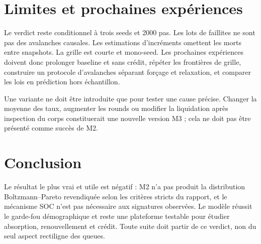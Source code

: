 \documentclass[11pt,a4paper]{article}
\begin{document}
\section{Limites et prochaines expériences}

Le verdict reste conditionnel à trois seeds et 2000 pas. Les lots de faillites ne
sont pas des avalanches causales. Les estimations d'incréments omettent les morts
entre snapshots. La grille est courte et mono-seed. Les prochaines expériences
doivent donc prolonger baseline et sans crédit, répéter les frontières de grille,
construire un protocole d'avalanches séparant forçage et relaxation, et comparer
les lois en prédiction hors échantillon.

Une variante ne doit être introduite que pour tester une cause précise. Changer
la moyenne des taux, augmenter les rounds ou modifier la liquidation après
inspection du corps constituerait une nouvelle version M3 ; cela ne doit pas être
présenté comme succès de M2.

\section{Conclusion}

Le résultat le plus vrai et utile est négatif : M2 n'a pas produit la
distribution Boltzmann--Pareto revendiquée selon les critères stricts du rapport,
et le mécanisme SOC n'est pas nécessaire aux signatures observées. Le modèle
réussit le garde-fou démographique et reste une plateforme testable pour étudier
absorption, renouvellement et crédit. Toute suite doit partir de ce verdict, non
du seul aspect rectiligne des queues.
\end{document}
